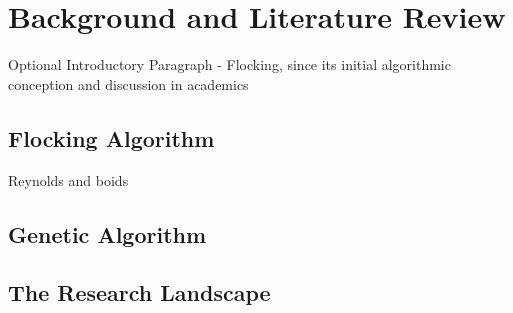 \section{Background and Literature Review}
	Optional Introductory Paragraph - Flocking, since its initial algorithmic conception and discussion in academics

	\subsection{Flocking Algorithm}
	Reynolds and boids %
	
	\subsection{Genetic Algorithm}

	\subsection{The Research Landscape}